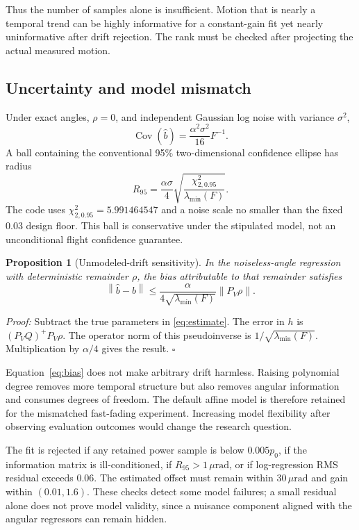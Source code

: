 \documentclass[journal]{IEEEtran}
\newtheorem{proposition}{Proposition}
\newcommand{\norm}[1]{\left\lVert#1\right\rVert}
\newcommand{\um}{\,\mu\mathrm{rad}}
\begin{document}
Thus the number of samples alone is insufficient. Motion that is nearly a temporal trend can be highly informative for a constant-gain fit yet nearly uninformative after drift rejection. The rank must be checked after projecting the actual measured motion.

\subsection{Uncertainty and model mismatch}
Under exact angles, $\rho=0$, and independent Gaussian log noise with variance $\sigma^2$,
\begin{equation}
 \operatorname{Cov}(\widehat b)=\frac{\alpha^2\sigma^2}{16}F^{-1}.
\end{equation}
A ball containing the conventional 95\% two-dimensional confidence ellipse has radius
\begin{equation}
 R_{95}=\frac{\alpha\sigma}{4}
 \sqrt{\frac{\chi^2_{2,0.95}}{\lambda_{\min}(F)}}.
 \label{eq:radius}
\end{equation}
The code uses $\chi^2_{2,0.95}=5.991464547$ and a noise scale no smaller than the fixed 0.03 design floor. This ball is conservative under the stipulated model, not an unconditional flight confidence guarantee.

\begin{proposition}[Unmodeled-drift sensitivity]
In the noiseless-angle regression with deterministic remainder $\rho$, the bias attributable to that remainder satisfies
\begin{equation}
 \norm{\widehat b-b}\leq
 \frac{\alpha}{4\sqrt{\lambda_{\min}(F)}}\norm{P_V\rho}.
 \label{eq:bias}
\end{equation}
\end{proposition}
\emph{Proof:} Subtract the true parameters in \eqref{eq:estimate}. The error in $h$ is $(P_VQ)^+P_V\rho$. The operator norm of this pseudoinverse is $1/\sqrt{\lambda_{\min}(F)}$. Multiplication by $\alpha/4$ gives the result. $\square$

Equation~\eqref{eq:bias} does not make arbitrary drift harmless. Raising polynomial degree removes more temporal structure but also removes angular information and consumes degrees of freedom. The default affine model is therefore retained for the mismatched fast-fading experiment. Increasing model flexibility after observing evaluation outcomes would change the research question.

The fit is rejected if any retained power sample is below $0.005p_0$, if the information matrix is ill-conditioned, if $R_{95}>1\um$, or if log-regression RMS residual exceeds 0.06. The estimated offset must remain within $30\um$ and gain within $(0.01,1.6)$. These checks detect some model failures; a small residual alone does not prove model validity, since a nuisance component aligned with the angular regressors can remain hidden.
\end{document}
